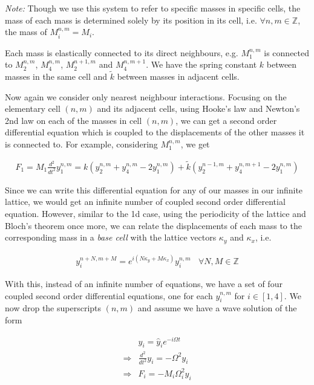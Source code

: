 \textit{Note:} Though we use this system to refer to specific masses in
specific cells, the mass of each mass is determined solely by its position in
its cell, i.e. $\forall n,m\in\mathbb{Z}$, the mass of $M_i^{n,m}=M_i$.

Each mass is elastically connected to its direct neighbours, e.g. $M_1^{n,m}$
is connected to $M_2^{n,m}$, $M_4^{n,m}$, $M_2^{n+1,m}$ and $M_4^{n,m+1}$. We
have the spring constant $k$ between masses in the same cell and $\tilde{k}$
between masses in adjacent cells.

Now again we consider only nearest neighbour interactions. Focusing on the
elementary cell $(n,m)$ and its adjacent cells, using Hooke's law and Newton's
2nd law on each of the masses in cell $(n,m)$, we can get a second order
differential equation which is coupled to the displacements of the other masses
it is connected to. For example, considering $M_1^{n,m}$, we get

\begin{align}
  F_1=M_1\frac{d^{2}}{dt^{2}}y_1^{n,m}
      =k\left(y_2^{n,m}+y_4^{n,m}-2y_1^{n,m}\right)+
       \tilde{k}\left(y_2^{n-1,m}+y_4^{n,m+1}-2y_1^{n,m}\right)
\label{eq:2dM1}
\end{align}

Since we can write this differential equation for any of our masses in our
infinite lattice, we would get an infinite number of coupled second order
differential equation. However, similar to the 1d case, using the periodicity
of the lattice and Bloch's theorem once more, we can relate the displacements
of each mass to the corresponding mass in a \textit{base cell} with the lattice
vectors $\kappa_y$ and $\kappa_x$, i.e.

\begin{align}
  y_i^{n+N,m+M}=e^{i\left(N\kappa_y+M\kappa_x\right)}y_i^{n,m}\ \ \ \ 
      \forall N,M\in\mathbb{Z}
\end{align}

With this, instead of an infinite number of equations, we have a set of four
coupled second order differential equations, one for each $y_i^{n,m}$ for
$i\in\left[1,4\right]$. We now drop the superscripts $\left(n,m\right)$ and
assume we have a wave solution of the form  

\begin{align}
  &y_{i}=\hat{y}_{i}e^{-i\Omega t} \\
  \Rightarrow &\frac{d^{2}}{dt^{2}}y_{i}=-\Omega^{2}y_{i} \\
  \Rightarrow &F_{i}=-M_i\Omega_i^{2}y_{i} \label{eq:N2L}
\end{align}

